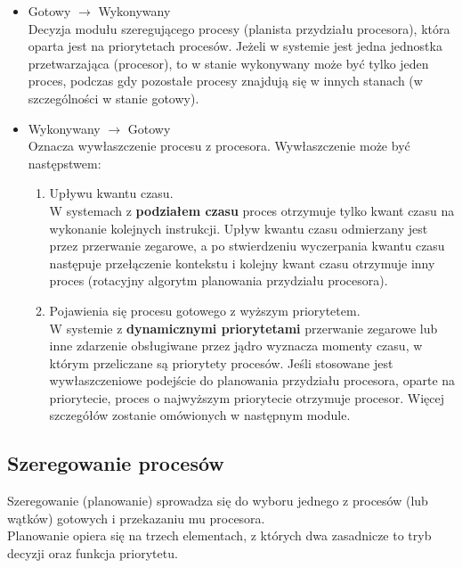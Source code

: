 \documentclass[main.tex]{subfiles}
\begin{document}
    \begin{itemize}
        \item Gotowy $\rightarrow$ Wykonywany \\
        Decyzja modułu szeregującego procesy (planista przydziału procesora), która oparta jest na priorytetach procesów. Jeżeli w systemie jest jedna jednostka przetwarzająca (procesor), to w stanie wykonywany może być tylko jeden proces, podczas gdy pozostałe procesy znajdują się w innych stanach (w szczególności w stanie gotowy).
        \item Wykonywany $\rightarrow$ Gotowy \\
        Oznacza wywłaszczenie procesu z procesora. Wywłaszczenie może być następstwem:
        \begin{enumerate}
            \item Upływu kwantu czasu. \\
            W systemach z \textbf{podziałem czasu} proces otrzymuje tylko kwant czasu na wykonanie kolejnych instrukcji.
            Upływ kwantu czasu odmierzany jest przez przerwanie zegarowe, a po stwierdzeniu wyczerpania kwantu czasu następuje przełączenie kontekstu i kolejny kwant czasu otrzymuje inny proces (rotacyjny algorytm planowania przydziału procesora).
            \item Pojawienia się procesu gotowego z wyższym priorytetem.\\
            W systemie z \textbf{dynamicznymi priorytetami} przerwanie zegarowe lub inne zdarzenie obsługiwane przez jądro wyznacza momenty czasu, w którym przeliczane są priorytety procesów. Jeśli stosowane jest wywłaszczeniowe podejście do planowania przydziału procesora, oparte na priorytecie, proces o najwyższym priorytecie otrzymuje procesor. Więcej szczegółów zostanie omówionych w następnym module.
        \end{enumerate}
    \end{itemize}

    \subsection{Szeregowanie procesów}

    Szeregowanie (planowanie) sprowadza się do wyboru jednego z procesów (lub wątków) gotowych i przekazaniu mu procesora. \\

    Planowanie opiera się na trzech elementach, z których dwa zasadnicze to tryb decyzji oraz funkcja priorytetu.
\end{document}
